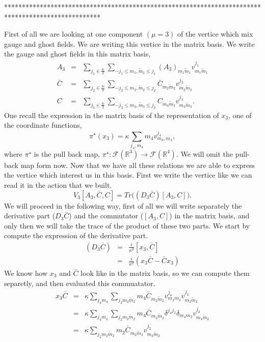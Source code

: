 \documentclass[a4paper,11pt]{article} %
\numberwithin{equation}{section} %
\numberwithin{figure}{section} %
\theoremstyle{plain} %
\theoremstyle{definition} %
\theoremstyle{remark} %
\begin{document}
***************************************************************************************************

\noindent
First of all we are looking at one component $(\mu=3)$ of the vertice which mix gauge and ghost fields. We are writing this vertice in the matrix basis.
We write the gauge and ghost fields in this matrix basis,
\begin{eqnarray*}
 A_3    &=&   \sum_{j_1 \in \frac{\mathbb{N}}{2} } \sum_{ -j_1 \leq m_1 , \tilde{m}_1 \leq j_1 } ( A_3 )_{m_1 \tilde{m}_1 } v^{j_1}_{m_1 \tilde{m}_1} \\
 \bar{C}  &=&   \sum_{j_2 \in \frac{\mathbb{N}}{2} } \sum_{ -j_2 \leq m_2 , \tilde{m}_2 \leq j_2 } \bar{C}_{m_2 \tilde{m}_2 } v^{j_2}_{m_2 \tilde{m}_2} \\
 C        &=&   \sum_{j_3 \in \frac{\mathbb{N}}{2} } \sum_{ -j_3 \leq m_3 , \tilde{m}_3 \leq j_3 } C_{m_3 \tilde{m}_3 } v^{j_3}_{m_3 \tilde{m}_3}.  
\end{eqnarray*}
One recall the expression in the matrix basis of the representation of $x_3$, one of the coordinate functions,
\begin{equation*}
 \pi^{\star}(x_3) = \kappa \sum_{j_4, m_4} m_4 v^{j_4}_{m_4,m_4},
\end{equation*}
where $\pi^{\star}$ is the pull back map, $\pi^{\star} : \mathcal{F}(\mathbb{R}^3) \rightarrow \mathcal{F}(\mathbb{R}^4)$. We will omit the pull-back map form now. Now that we have all these relations we are able to express the vertice which interest us in this basis. First we write the vertice like we can read it in the action that we built.
\begin{equation*}
 V_3 [A_3, \bar{C}, C] = Tr \big( (D_3 \bar{C}) [A_3,C] \big). 
\end{equation*}
We will proceed in the following way, first of all we will write separately the derivative part ($D_3 \bar{C}$) and the commutator ($[A_3, C]$) in the matrix basis, and only then we will take the trace of the product of these two parts. We start by compute the expression of the derivative part.
\begin{eqnarray*}
 (D_3 \bar{C}) &=& \frac{i}{\kappa^2} [x_3,\bar{C}] \\
               &=& \frac{i}{\kappa^2} (x_3\bar{C}-\bar{C}x_3) 
\end{eqnarray*}
We know how $x_3$ and $\bar{C}$ look like in the matrix basis, so we can compute them separetly, and then evaluated this commuatator.
\begin{eqnarray*}
 x_3\bar{C} &=& \kappa \sum_{j_4 m_4} \sum_{j_2 m_2 \tilde{m}_2} m_4 \bar{C}_{m_2 \tilde{m}_2} v^{j_4}_{m_4 m_4} v^{j_2}_{m_2 \tilde{m}_2} \\
            &=& \kappa \sum_{j_4 m_4} \sum_{j_2 m_2 \tilde{m}_2} m_4 \bar{C}_{m_2 \tilde{m}_2} \delta^{j_4 j_2} \delta_{m_4 m_2} v^{j_2}_{m_4 \tilde{m}_2} \\
            &=& \kappa \sum_{j_2 m_2 \tilde{m}_2} m_2 \bar{C}_{m_2 \tilde{m}_2} v^{j_2}_{m_2 \tilde{m}_2}
\end{eqnarray*}
\end{document}
